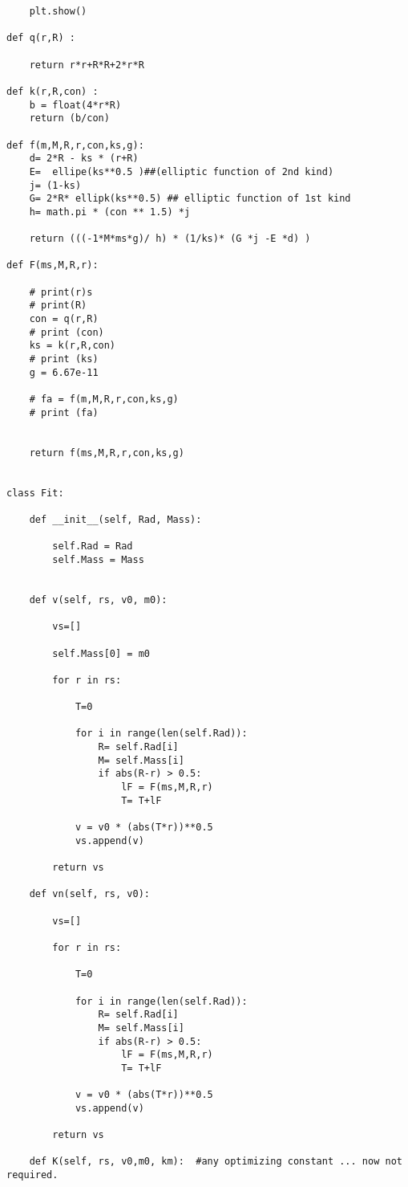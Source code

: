 \begin{verbatim}
    plt.show()

def q(r,R) :

    return r*r+R*R+2*r*R

def k(r,R,con) :
    b = float(4*r*R)
    return (b/con)

def f(m,M,R,r,con,ks,g):
    d= 2*R - ks * (r+R)
    E=  ellipe(ks**0.5 )##(elliptic function of 2nd kind)
    j= (1-ks)
    G= 2*R* ellipk(ks**0.5) ## elliptic function of 1st kind
    h= math.pi * (con ** 1.5) *j

    return (((-1*M*ms*g)/ h) * (1/ks)* (G *j -E *d) )

def F(ms,M,R,r):

    # print(r)s
    # print(R)
    con = q(r,R)
    # print (con)
    ks = k(r,R,con)
    # print (ks)
    g = 6.67e-11

    # fa = f(m,M,R,r,con,ks,g)
    # print (fa)


    return f(ms,M,R,r,con,ks,g)


class Fit:

    def __init__(self, Rad, Mass):

        self.Rad = Rad
        self.Mass = Mass


    def v(self, rs, v0, m0):

        vs=[]

        self.Mass[0] = m0

        for r in rs:

            T=0

            for i in range(len(self.Rad)):
                R= self.Rad[i]
                M= self.Mass[i]
                if abs(R-r) > 0.5:
                    lF = F(ms,M,R,r)
                    T= T+lF

            v = v0 * (abs(T*r))**0.5
            vs.append(v)

        return vs

    def vn(self, rs, v0):

        vs=[]

        for r in rs:

            T=0

            for i in range(len(self.Rad)):
                R= self.Rad[i]
                M= self.Mass[i]
                if abs(R-r) > 0.5:
                    lF = F(ms,M,R,r)
                    T= T+lF

            v = v0 * (abs(T*r))**0.5
            vs.append(v)

        return vs

    def K(self, rs, v0,m0, km):  #any optimizing constant ... now not required.


\end{verbatim}
